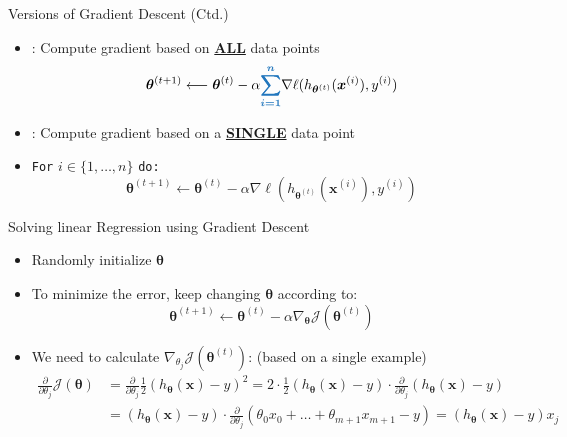 \begin{frame}{Versions of Gradient Descent (Ctd.)}{}
	\begin{itemize}
		\item {}: Compute gradient based on \textbf{\underline{ALL}} data points
		\begin{equation}
			\bm{\theta}^{(t+1)} \longleftarrow \bm{\theta}^{(t)} - \alpha
				\textcolor{myblue1}{\bm{\sum_{i=1}^{n}}} \nabla \ell(h_{\bm{\theta}^{(t)}}(\bm{x}^{(i)}), y^{(i)})
		\end{equation}
		
		\item {}: Compute gradient based on a \textbf{\underline{SINGLE}} data point
		\item \texttt{For} $i \in \{1, \dots, n\}$ \texttt{do:}
		\vspace*{-3mm}
		\begin{equation}
			\bm{\theta}^{(t+1)} \longleftarrow \bm{\theta}^{(t)} - \alpha \nabla \ell(h_{\bm{\theta}^{(t)}}(\bm{x}^{(i)}), y^{(i)})
		\end{equation}
	\end{itemize}
\end{frame}


\begin{frame}{Solving linear Regression using Gradient Descent}{}
	\begin{itemize}
		\item Randomly initialize $\bm{\theta}$
		\item To minimize the error, keep changing $\bm{\theta}$ according to:
		\begin{equation}
			\bm{\theta}^{(t+1)} \longleftarrow \bm{\theta}^{(t)}
				- \alpha \nabla_{\bm{\theta}}\mathcal{J}(\bm{\theta}^{(t)})
		\end{equation}
		\item We need to calculate $\nabla_{\theta_j}\mathcal{J}(\bm{\theta}^{(t)})$: 
			{\footnotesize (based on a single example)}
		{\footnotesize
		\begin{align}
			\frac{\partial}{\partial \theta_j} \mathcal{J}(\bm{\theta})
				&= \frac{\partial}{\partial \theta_j} \frac{1}{2}(h_{\bm{\theta}}(\bm{x}) - y)^2
					= 2 \cdot \frac{1}{2} (h_{\bm{\theta}}(\bm{x}) - y) \cdot \frac{\partial}{\partial \theta_j}
						(h_{\bm{\theta}}(\bm{x}) - y) \\
				&= (h_{\bm{\theta}}(\bm{x}) - y) \cdot \frac{\partial}{\partial \theta_j}
					(\theta_0 x_0 + \dots + \theta_{m+1} x_{m+1} - y)
					= \boxed{(h_{\bm{\theta}}(\bm{x}) - y) x_j}
		\end{align}}
	\end{itemize}
\end{frame}


